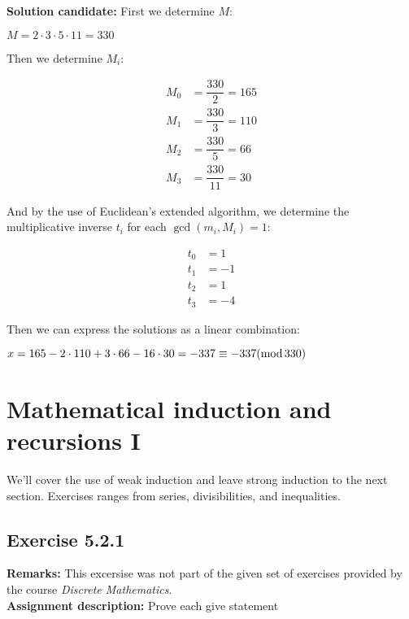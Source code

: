 \documentclass{report}
\newcommand{\cent}[1]{\begin{center}#1\end{center}}
\newcommand{\mAlign}[1]{\begin{align*}#1\end{align*}}
\newcommand{\AssignmentDescription}{\textbf{Assignment description: }}
\newcommand{\myRemark}{\textbf{Remarks: }}
\newcommand{\Solution}{\textbf{Solution candidate: }}
\newcommand{\Exercise}[1]{\subsection{Exercise #1}}
\newcommand{\defaultEnumerateLabel}{\textbf{\alph*.}}
\newcommand{\modInline}{\text{mod\,}}
\begin{document}
\begin{enumerate}[label=\defaultEnumerateLabel]
	\Solution
	First we determine $M$:
	
	\cent{$M = 2 \cdot 3 \cdot 5 \cdot 11 = 330$}
	
	Then we determine $M_i$:
	
	\mAlign{
		M_0 &= \dfrac{330}{2} = 165 \\
		M_1 &= \dfrac{330}{3} = 110 \\
		M_2 &= \dfrac{330}{5} = 66 \\
		M_3 &= \dfrac{330}{11} = 30
	}
	
	And by the use of Euclidean's extended algorithm, we determine the multiplicative inverse $t_i$ for each $\gcd(m_i,M_i) = 1$:
	
	\mAlign{
		t_0 &= 1 \\
		t_1 &= -1 \\
		t_2 &= 1 \\
		t_3 &= -4
	}
	
	Then we can express the solutions as a linear combination:
	
	\cent{$x=165 - 2 \cdot 110 + 3 \cdot 66 - 16 \cdot 30 = -337 \equiv -337 (\modInline 330)$}
	
	\end{enumerate}
 	
 	\section{Mathematical induction and recursions I}
 	
 	We'll cover the use of weak induction and leave strong induction to the next section. Exercises ranges from series, divisibilities, and inequalities. 
 	\Exercise{5.2.1}
 	\myRemark
 	This excersise was not part of the given set of exercises provided by the course \textit{Discrete Mathematics}.\\
 	
 	\AssignmentDescription
 	Prove each give statement
 	
\end{document}
